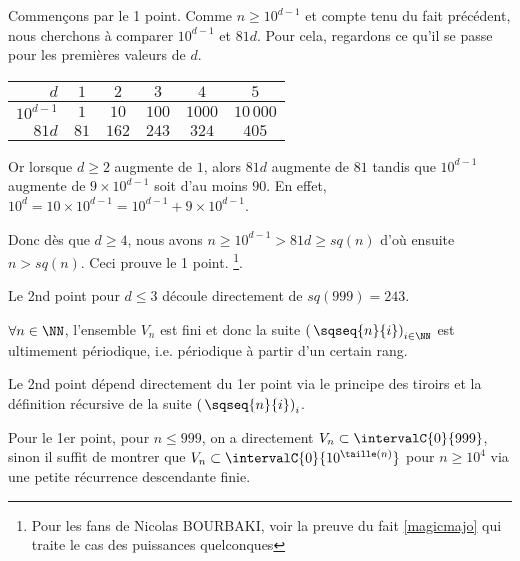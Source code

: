 \begin{proof*}
	Commençons par le 1\ier{} point.
	Comme $n \geqslant 10^{d-1}$ et compte tenu du fait précédent, nous cherchons à comparer $10^{d-1}$ et $81d$.
	Pour cela, regardons ce qu'il se passe pour les premières valeurs de $d$.

	\smallskip
	\begin{center}
		\begin{tabular}{|r|c|c|c|c|c|}
			\hline
				$d$        & $1$  & $2$   & $3$   & $4$    & $5$        \\
			\hline
				$10^{d-1}$ & $1$  & $10$  & $100$ & $1000$ & $10\,000$  \\
			\hline
				$81d$      & $81$ & $162$ & $243$ & $324$  & $405$      \\
			\hline
		\end{tabular}
	\end{center}
	\smallskip
	
	Or lorsque $d \geqslant 2$ augmente de $1$, alors $81d$ augmente de $81$ tandis que $10^{d-1}$ augmente de $9\times10^{d-1}$ soit d'au moins $90$.
	En effet, $10^d = 10 \times 10^{d-1} = 10^{d-1} + 9 \times 10^{d-1}$.
	
	
	\smallskip
	
	Donc dès que $d \geqslant 4$, nous avons $n \geqslant 10^{d-1} > 81d \geqslant sq(n)$ d'où ensuite $n > sq(n)$.
	Ceci prouve le 1\ier{} point.
	\footnote{
		Pour les fans de Nicolas BOURBAKI, voir la preuve  du fait \ref{magicmajo} qui traite le cas des puissances quelconques
	}.


	\bigskip
	
	Le 2nd point pour $d \leqslant 3$ découle directement de $sq(999) = 243$.
\end{proof*}




\medskip

\begin{fact}
	$\forall n \in \NN$, l'ensemble $V_n$ est fini et donc la suite $\left( \, \sqseq{n}{i} \right)_{i \in \NN}$ est ultimement périodique, i.e. périodique à partir d'un certain rang.
\end{fact}

\begin{proof*}
	Le 2nd point dépend directement du 1er point via le principe des tiroirs et la définition récursive de la suite $\left( \, \sqseq{n}{i} \right)_i$.
	
	\medskip
	
	Pour le 1er point, pour $n \leqslant 999$, on a directement $V_n \subset \intervalC{0}{999}$,
	sinon il suffit de montrer que $V_n \subset \intervalC{0}{10^{\taille(n)}}$ pour $n \geqslant 10^4$ via une petite récurrence descendante finie.
\end{proof*}